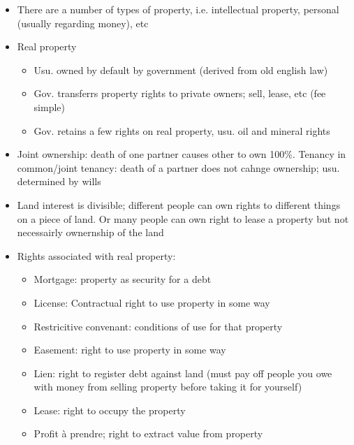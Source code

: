 \documentclass[10pt]{article}
\begin{document}
\begin{itemize}
	\item There are a number of types of property, i.e. intellectual property, personal (usually regarding money), etc
	\item Real property
		\begin{itemize}
			\item Usu. owned by default by government (derived from old english law)
			\item Gov. transferrs property rights to private owners; sell, lease, etc (fee simple)
			\item Gov. retains a few rights on real property, usu. oil and mineral rights
		\end{itemize}
	\item Joint ownership: death of one partner causes other to own 100\%. Tenancy in common/joint tenancy: death of a partner does not cahnge ownership; usu. determined by wills
	\item Land interest is divisible; different people can own rights to different things on a piece of land. Or many people can own right to lease a property but not necessairly ownernship of the land

	\item Rights associated with real property:

		\begin{itemize}
			\item Mortgage: property as security for a debt
			\item License: Contractual right to use property in some way
			\item Restricitive convenant: conditions of use for that property
			\item Easement: right to use property in some way
			\item Lien: right to register debt against land (must pay off people you owe with money from selling property before taking it for yourself)
			\item Lease: right to occupy the property
			\item  Profit à prendre; right to extract value from property
		\end{itemize}


\end{itemize}
\end{document}
